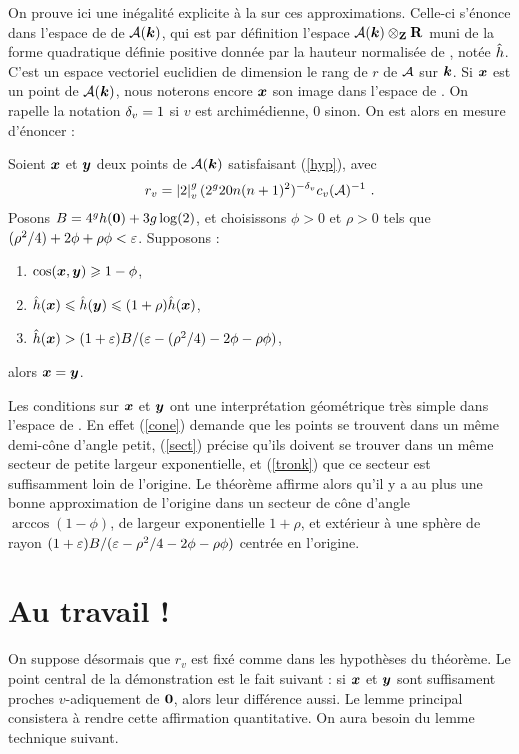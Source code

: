 On prouve ici une inégalité explicite à la  sur ces
approximations. Celle-ci s'énonce dans l'espace de  de
$\mathcal{A}(\boldsymbol{k})$, qui est par définition l'espace $\mathcal{A}(\boldsymbol{k})\otimes_{\mathbf{Z}} \mathbf{R}$ muni de la
forme quadratique définie positive donnée par la hauteur normalisée de
, notée $\hat{h}$. C'est un espace vectoriel euclidien de
dimension le rang de  $r$ de $\mathcal{A}$ sur $\boldsymbol{k}$. Si ${\boldsymbol{x}}$ est
un point de $\mathcal{A}(\boldsymbol{k})$, nous noterons encore ${\boldsymbol{x}}$ son image dans l'espace
de . On rapelle la notation ${\delta_v} = 1$ si $v$ est
archimédienne, $0$ sinon. On est alors en mesure d'énoncer :

\begin{thm} \label{mumpt}
  Soient ${\boldsymbol{x}}$ et ${\boldsymbol{y}}$ deux points de $\mathcal{A}(\boldsymbol{k})$ satisfaisant (\ref{hyp}),
  avec
  \[
  r_v = \left\lvert2\right\rvert_{v}^g(2^g20n(n+1)^2)^{-{\delta_v}} c_v(\mathcal{A})^{-1} \text{ .}
  \]
  Posons $B =
  4^gh({\boldsymbol{0}})+ 3g\log(2)$, et choisissons $\phi > 0$ et $\rho > 0$ tels que
  $(\rho^2/4) + 2\phi + \rho\phi< \varepsilon$. Supposons :
  \begin{enumerate}
  \item $\cos({\boldsymbol{x}},{\boldsymbol{y}}) \geqslant 1-\phi$, \label{cone}
  \item $\hat{h}({\boldsymbol{x}}) \leqslant \hat{h}({\boldsymbol{y}}) \leqslant (1+\rho)\hat{h}({\boldsymbol{x}})$, \label{sect}
  \item $\hat{h}({\boldsymbol{x}}) > (1+\varepsilon)B/(\varepsilon - (\rho^2/4) - 2\phi - \rho\phi)$,
    \label{tronk}
  \end{enumerate}
  alors ${\boldsymbol{x}} = {\boldsymbol{y}}$.
\end{thm}

Les conditions sur ${\boldsymbol{x}}$ et ${\boldsymbol{y}}$ ont une interprétation géométrique très
simple dans l'espace de . En effet (\ref{cone}) demande que
les points se trouvent dans un même demi-cône d'angle petit, (\ref{sect})
précise qu'ils doivent se trouver dans un même secteur de petite largeur
exponentielle, et (\ref{tronk}) que ce secteur est suffisamment loin de
l'origine. Le théorème affirme alors qu'il y a au plus une bonne approximation
de l'origine dans un secteur de cône d'angle $\arccos(1-\phi)$, de largeur
exponentielle $1+\rho$, et extérieur à une sphère de rayon $(1+\varepsilon)B/(\varepsilon -
\rho^2/4 - 2\phi - \rho\phi )$ centrée en l'origine.

\section{Au travail !}

On suppose désormais que $r_v$ est fixé comme dans les hypothèses du théorème.
Le point central de la démonstration est le fait suivant : si ${\boldsymbol{x}}$ et
${\boldsymbol{y}}$ sont suffisament proches $v$-adiquement de ${\boldsymbol{0}}$, alors leur
différence aussi. Le lemme principal consistera à rendre cette affirmation
quantitative. On aura besoin du lemme technique suivant.

